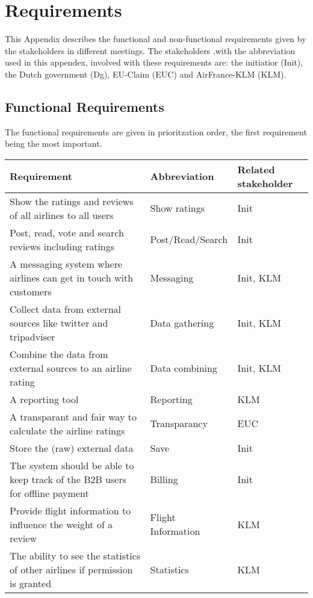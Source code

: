 \section{Requirements}
This Appendix describes the functional and non-functional requirements given by the stakeholders in different meetings. The stakeholders ,with the abbreviation used in this appendex, involved with these requirements are: the initiatior (Init), the Dutch government (Dg), EU-Claim (EUC) and AirFrance-KLM (KLM). 

\subsection*{Functional Requirements}
The functional requirements are given in prioritzation order, the first requirement being the most important. 

\begin{longtable}{| p{10cm}| l | l |}
\hline
\textbf{Requirement} & \textbf{Abbreviation} & \textbf{Related stakeholder} \\ \hline
Show the ratings and reviews of all airlines to all users & Show ratings & Init \\ \hline
Post, read, vote and search reviews including ratings & Post/Read/Search & Init \\ \hline
A messaging system where airlines can get in touch with customers & Messaging & Init, KLM\\ \hline
Collect data from external sources like twitter and tripadviser & Data gathering &Init, KLM \\ \hline
Combine the data from external sources to an airline rating & Data combining &Init, KLM \\ \hline
A reporting tool & Reporting & KLM \\ \hline
A transparant and fair way to calculate the airline ratings & Transparancy & EUC \\ \hline
Store the (raw) external data & Save & Init\\ \hline
The system should be able to keep track of the B2B users for offline payment & Billing & Init \\ \hline
Provide flight information to influence the weight of a review & Flight Information & KLM  \\ \hline
The ability to see the statistics of other airlines if permission is granted & Statistics & KLM \\ \hline 

\end{longtable}

